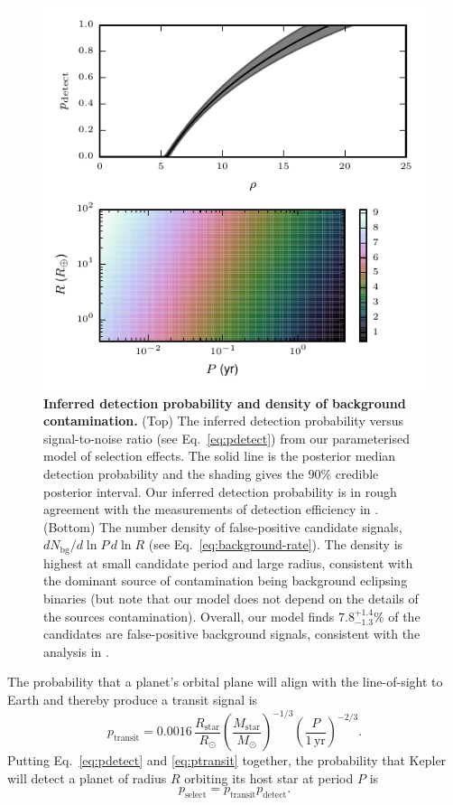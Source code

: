 \documentclass[apjl]{emulateapj}
\newcommand{\RSun}{R_\odot}
\newcommand{\RStar}{R_\mathrm{star}}
\newcommand{\MStar}{M_\mathrm{star}}
\newcommand{\MSun}{M_\odot}
\newcommand{\Nbg}{N_\mathrm{bg}}
\newcommand{\fposrange}{7.8_{-1.3}^{+1.4}\%}
\begin{document}
\begin{figure}
  \includegraphics[width=\columnwidth]{bg}
  \caption{\label{fig:det-bg} \textbf{Inferred detection probability
      and density of background contamination.} (Top) The inferred
    detection probability versus signal-to-noise ratio (see Eq.\
    \eqref{eq:pdetect}) from our parameterised model of selection
    effects.  The solid line is the posterior median detection
    probability and the shading gives the 90\% credible posterior
    interval.  Our inferred detection probability is in rough
    agreement with the measurements of detection efficiency in
    \citet{Borucki2011,Batalha2013}.  (Bottom) The number density of
    false-positive candidate signals, $d\Nbg/d\ln P \, d\ln R$ (see
    Eq.\ \eqref{eq:background-rate}).  The density is highest at small
    candidate period and large radius, consistent with the dominant
    source of contamination being background eclipsing binaries
    \citep{Morton2011,Fressin2013} (but note that our model does not
    depend on the details of the sources contamination).  Overall, our
    model finds $\fposrange$ of the candidates are false-positive
    background signals, consistent with the analysis in
    \citet{Morton2011,Fressin2013}.}
\end{figure}

The probability that a planet's orbital plane will align with the
line-of-sight to Earth and thereby produce a transit signal is
\begin{equation}
  \label{eq:ptransit}
  p_\mathrm{transit} = 0.0016\, \frac{\RStar}{\RSun}
  \left(\frac{\MStar}{\MSun}\right)^{-1/3} \left(\frac{P}{1\,\mathrm{yr}}\right)^{-2/3}.
\end{equation}
Putting Eq.\ \ref{eq:pdetect} and \ref{eq:ptransit} together, the
probability that Kepler will detect a planet of radius $R$ orbiting
its host star at period $P$ is 
\begin{equation}
  \label{eq:pselect}
  p_\mathrm{select} = p_\mathrm{transit} p_\mathrm{detect}.
\end{equation}
\end{document}
